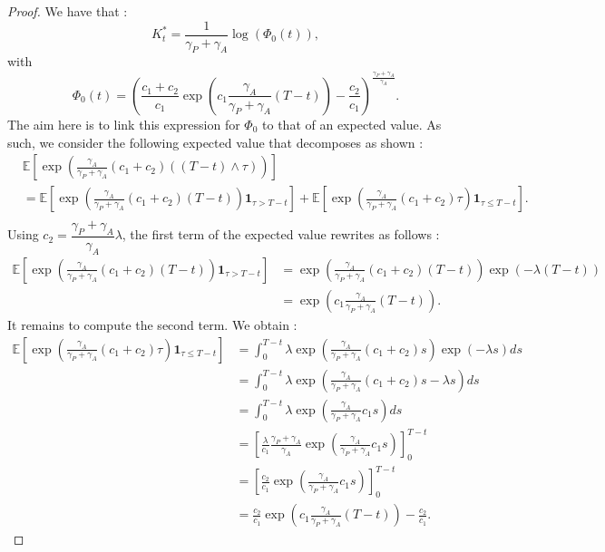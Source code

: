 \documentclass[numbook, envcountsect, envcountsame, envcountreset, runningheads, smallextended]{article}
\def \E{\mathbb{E}}
\begin{document}
\begin{proof}
We have that : 
$$K^*_t = \dfrac{1}{\gamma_P + \gamma_A} \log(\Phi_0(t)) ,$$ 
with $$\Phi_0(t) = \left(  \frac{c_1 + c_2}{c_1} \exp\left(c_1 \frac{\gamma_A}{\gamma_P + \gamma_A}(T-t)\right) - \frac{c_2}{c_1}\right)^{\frac{\gamma_P+\gamma_A}{\gamma_A}}.$$
The aim here is to link this expression for $\Phi_0$ to that of an expected value. As such, we consider the following expected value that decomposes as shown  : 
\begin{align*}
&\E\left[\exp\left(\frac{\gamma_A}{\gamma_P+\gamma_A}(c_1+c_2)((T-t) \wedge \tau)\right)\right] \\
&= \E\left[ \exp\left(\frac{\gamma_A}{\gamma_P+\gamma_A}(c_1+c_2)(T-t) \right) \textbf{1}_{\tau > T-t}\right]+ \E\left[ \exp\left(\frac{\gamma_A}{\gamma_P+\gamma_A}(c_1+c_2)\tau \right) \textbf{1}_{\tau \leq T-t}\right].\\
\end{align*}
Using $c_2 = \dfrac{\gamma_P + \gamma_A}{\gamma_A} \lambda$, the first term of the expected value rewrites as follows : 
\begin{align*} \E\left[ \exp\left(\frac{\gamma_A}{\gamma_P+\gamma_A}(c_1+c_2)(T-t) \right) \textbf{1}_{\tau > T-t}\right] 
&=  \exp\left(\frac{\gamma_A}{\gamma_P+\gamma_A}(c_1+c_2)(T-t) \right) \exp\left(- \lambda(T-t) \right)  \\
&=   \exp\left(c_1 \frac{\gamma_A}{\gamma_P+\gamma_A} (T-t) \right).
\end{align*}
It remains to compute the second term. We obtain :  
\begin{align*}
 \E\left[ \exp\left(\frac{\gamma_A}{\gamma_P+\gamma_A}(c_1+c_2)\tau \right) \textbf{1}_{\tau \leq T-t}\right] &= \int_0^{T-t} \lambda \exp\left( \frac{\gamma_A}{\gamma_P+\gamma_A}(c_1+c_2)s            \right)  \exp\left(- \lambda s\right) ds\\
 &=\int_0^{T-t} \lambda \exp\left( \frac{\gamma_A}{\gamma_P+\gamma_A}(c_1+c_2)s            - \lambda s\right) ds\\
 &= \int_0^{T-t} \lambda \exp\left( \frac{\gamma_A}{\gamma_P+\gamma_A} c_1 s           \right) ds\\
 &= \left[ \frac{\lambda}{c_1}\frac{\gamma_P + \gamma_A}{\gamma_A}  \exp\left( \frac{\gamma_A}{\gamma_P+\gamma_A} c_1 s           \right)\right]_0^{T-t}\\
  &= \left[ \frac{c_2}{c_1}  \exp\left( \frac{\gamma_A}{\gamma_P+\gamma_A} c_1 s           \right)\right]_0^{T-t}\\
 &= \frac{c_2}{c_1}   \exp\left( c_1 \frac{\gamma_A}{\gamma_P+\gamma_A} (T-t)           \right) -  \frac{c_2}{c_1} . 

\end{align*}
\end{proof}
\end{document}
